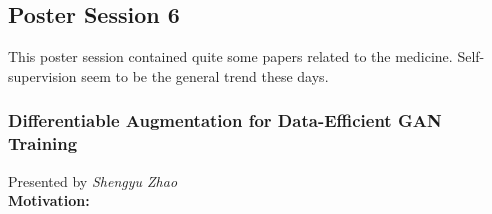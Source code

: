 \subsection{Poster Session 6}

This poster session contained quite some papers related to the medicine.
Self-supervision seem to be the general trend these days.

\spacerule
\subsubsection{Differentiable Augmentation for Data-Efficient GAN Training \cite{ZhaoLLZ020}}

Presented by \textit{Shengyu Zhao} \\

{\bf Motivation:} 